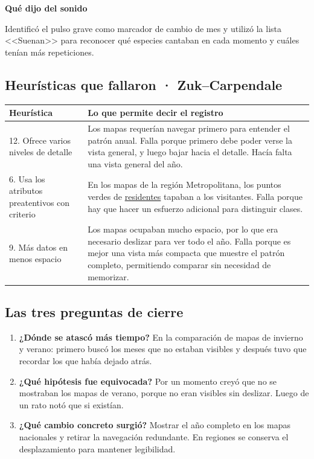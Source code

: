 \documentclass[11pt,a4paper]{article}
\newcommand{\campo}[1]{\par\needspace{3\baselineskip}\textbf{#1}\par\nopagebreak}
\DeclareRobustCommand{\concepto}[2]{\hyperlink{concepto:#1}{\textcolor{acento}{#2}}}
\begin{document}
\campo{Qué dijo del sonido}
Identificó el pulso grave como marcador de cambio de mes y utilizó la lista <<Suenan>> para reconocer qué especies cantaban en cada momento y cuáles tenían más repeticiones.

\subsection*{Heurísticas que fallaron · Zuk--Carpendale}
\begin{tabularx}{\linewidth}{@{}p{69mm} X@{}}
\toprule
Heurística & Lo que permite decir el registro\\
\midrule
12. Ofrece varios niveles de detalle & Los mapas requerían navegar primero para entender el patrón anual. Falla porque primero debe poder verse la vista general, y luego bajar hacia el detalle. Hacía falta una vista general del año. \\
6. Usa los atributos preatentivos con criterio & En los mapas de la región Metropolitana, los puntos verdes de \concepto{clases}{residentes} tapaban a los visitantes. Falla porque hay que hacer un esfuerzo adicional para distinguir clases.\\
9. Más datos en menos espacio & Los mapas ocupaban mucho espacio, por lo que era necesario deslizar para ver todo el año. Falla porque es mejor una vista más compacta que muestre el patrón completo, permitiendo comparar sin necesidad de memorizar. \\
\bottomrule
\end{tabularx}

\subsection*{Las tres preguntas de cierre}
\begin{enumerate}
\item \textbf{¿Dónde se atascó más tiempo?} En la comparación de mapas de invierno y verano: primero buscó los meses que no estaban visibles y después tuvo que recordar los que había dejado atrás.
\item \textbf{¿Qué hipótesis fue equivocada?} Por un momento creyó que no se mostraban los mapas de verano, porque no eran visibles sin deslizar. Luego de un rato notó que si existían.
\item \textbf{¿Qué cambio concreto surgió?} Mostrar el año completo en los mapas nacionales y retirar la navegación redundante. En regiones se conserva el desplazamiento para mantener legibilidad.
\end{enumerate}
\end{document}
